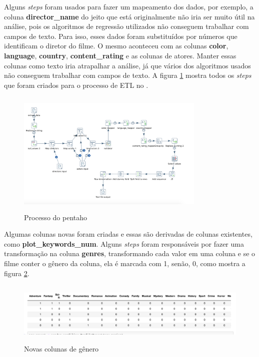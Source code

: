 Alguns \textit{steps} foram usados para fazer um mapeamento dos dados, por exemplo, a coluna \textbf{director\_name} do jeito que está originalmente não iria ser muito útil na análise, pois os algoritmos de regressão utilizados não conseguem trabalhar com campos de texto. Para isso, esses dados foram substituídos por números que identificam o diretor do filme. O mesmo aconteceu com as colunas \textbf{color}, \textbf{language}, \textbf{country}, \textbf{content\_rating} e as colunas de atores. Manter essas colunas como texto iria atrapalhar a análise, já que vários dos algoritmos usados não conseguem trabalhar com campos de texto. A figura \ref{pentahoTransformation} mostra todos os \textit{steps} que foram criados para o processo de ETL no \pdi.

\begin{figure}[H]
\centering
\includegraphics[height=6cm, width=9cm]{imagens/transformacao.png}
\caption{Processo do pentaho}
\label{pentahoTransformation}
\end{figure}

Algumas colunas novas foram criadas e essas são derivadas de colunas existentes, como \textbf{plot\_keywords\_num}. Alguns \textit{steps} foram responsáveis por fazer uma transformação na coluna \textbf{genres}, transformando cada valor em uma coluna e se o filme conter o gênero da coluna, ela é marcada com 1, senão, 0, como mostra a figura \ref{newcolumns}.

\begin{figure}[H]
\centering
\includegraphics[height=3cm]{imagens/genres.png}
\caption{Novas colunas de gênero}
\label{newcolumns}
\end{figure}

